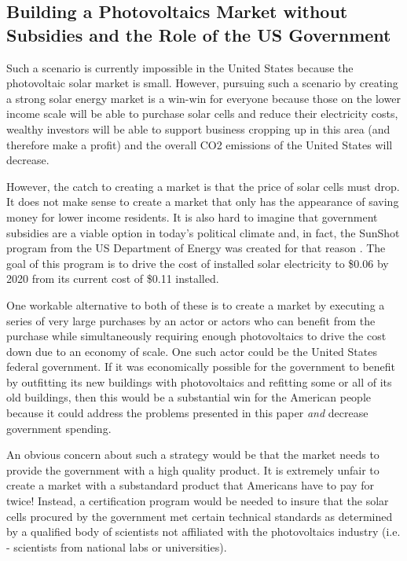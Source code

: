 \subsection{Building a Photovoltaics Market without Subsidies and the Role of the US Government}

Such a scenario is currently impossible in the United States because the photovoltaic solar market is small. However, pursuing such a scenario by creating a strong solar energy market is a win-win for everyone because those on the lower income scale will be able to purchase solar cells and reduce their electricity costs, wealthy investors will be able to support business cropping up in this area (and therefore make a profit) and the overall CO2 emissions of the United States will decrease. 

However, the catch to creating a market is that the price of solar cells must drop. It does not make sense to create a market that only has the appearance of saving money for lower income residents. It is also hard to imagine that government subsidies are a viable option in today’s political climate and, in fact, the SunShot program from the US Department of Energy was created for that reason \cite{sunshot}. The goal of this program is to drive the cost of installed solar electricity to \$0.06 by 2020 from its current cost of \$0.11 installed.

One workable alternative to both of these is to create a market by executing a series of very large purchases by an actor or actors who can benefit from the purchase while simultaneously requiring enough photovoltaics to drive the cost down due to an economy of scale. One such actor could be the United States federal government. If it was economically possible for the government to benefit by outfitting its new buildings with photovoltaics and refitting some or all of its old buildings, then this would be a substantial win for the American people because it could address the problems presented in this paper \textit{and} decrease government spending. 

An obvious concern about such a strategy would be that the market needs to provide the government with a high quality product. It is extremely unfair to create a market with a substandard product that Americans have to pay for twice! Instead, a certification program would be needed to insure that the solar cells procured by the government met certain technical standards as determined by a qualified body of scientists not affiliated with the photovoltaics industry (i.e. - scientists from national labs or universities). 

